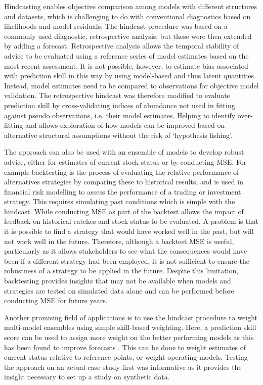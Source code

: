 \documentclass[12pt,halfline,a4paper,nonumbib]{ouparticle}
\begin{document}
 
Hindcasting enables objective comparison among models with different structures and datasets, which is challenging to do with conventional diagnostics based on likelihoods and model residuals. The hindcast procedure was based on a commonly used diagnostic, retrospective analysis, but these were then extended by adding a forecast. Retrospective analysis allows the temporal stability of advice to be evaluated using a reference series of model estimates based on the most recent assessment. It is not possible, however, to estimate bias associated with prediction skill in this way by using model-based and thus latent quantities. Instead, model estimates need to be compared to observations for objective model validation. The retrospective hindcast was therefore modified to evaluate prediction skill by cross-validating indices of abundance not used in fitting against pseudo observations, i.e. their model estimates. Helping to identify over-fitting and allows exploration of how models can be improved based on alternative structural assumptions without the risk of ‘hypothesis fishing’. 

The approach can also be used with an ensemble of models to develop robust advice, either for estimates of current stock status or by conducting MSE. For example backtesting is the process of evaluating the relative performance of alternatives strategies by comparing these to historical results, and is used in financial risk modelling to assess the performance of a trading or investment strategy. This requires simulating past conditions which is simple with the hindcast. While conducting MSE as part of the backtest allows the impact of feedback on historical catches and stock status to be evaluated. A problem is that it is possible to find a strategy that would have worked well in the past, but will not work well in the future. Therefore, although a backtest MSE is useful, particularly as it allows stakeholders to see what the consequences would have been if a different strategy had been employed, it is not sufficient to ensure the robustness of a strategy to be applied in the future. Despite this limitation, backtesting provides insights that may not be available when models and strategies are tested on simulated data alone and can be performed before conducting MSE for future years.

Another promising field of applications is to use the hindcast procedure to weight multi-model ensembles using simple skill-based weighting. Here, a prediction skill score can be used to assign more weight on the better performing models as this has been found to improve forecasts \parencite[e.g.][]{casanova2009weighting}. This can be done to weight estimates of current status relative to reference points, or weight operating models. Testing the approach on an actual case study first was informative as it provides the insight necessary to set up a study on synthetic data.
\end{document}
